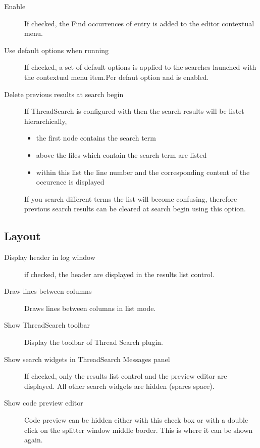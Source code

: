 \begin{description}
\item[Enable ] If checked, the Find occurrences of  entry is added to the editor contextual menu.
\item[Use default options when running ] If checked, a set of default options is applied to the searches launched with the  contextual menu item.Per defaut option  and  is enabled.
\item[Delete previous results at search begin] If ThreadSearch is configured with  then the search results will be listet hierarchically,
\begin{itemize}
\item the first node contains the search term
\item above the files which contain the search term are listed
\item within this list the line number and the corresponding content of the occurence is displayed
\end{itemize}
If you search different terms the list will become confusing, therefore previous search results can be cleared at search begin using this option.
\end{description}

\subsection{Layout}

\begin{description}
\item[Display header in log window] if checked, the header are displayed in the results list control.
\item[Draw lines between columns] Draws lines between columns in list mode.
\item[Show ThreadSearch toolbar] Display the toolbar of Thread Search plugin.
\item[Show search widgets in ThreadSearch Messages panel] If checked, only the results list control and the preview editor are displayed. All other search widgets are hidden (spares space).
\item[Show code preview editor] Code preview can be hidden either with this check box or with a double click on the splitter window middle border. This is where it can be shown again.
\end{description}

